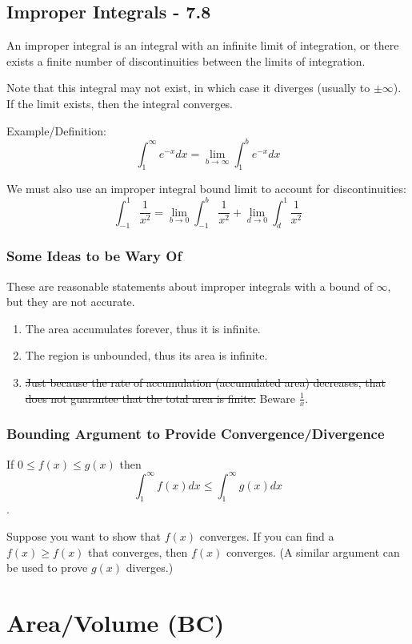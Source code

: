 \documentclass{article}
\begin{document}
\subsection{Improper Integrals - 7.8}
An improper integral is an integral with an infinite limit of integration, or there exists a finite number of discontinuities between the limits of integration.

Note that this integral may not exist, in which case it diverges (usually to $\pm \infty$). If the limit exists, then the integral converges.

Example/Definition:
$$\int_{1}^{\infty} e^{-x} dx = \lim_{b \to \infty} \int_{1}^{b} e^{-x} dx $$

We must also use an improper integral bound limit to account for discontinuities:
$$\int_{-1}^{1} \frac{1}{x^2} = \lim_{b \to 0} \int_{-1}^{b} \frac{1}{x^2} + \lim_{d \to 0} \int_{d}^{1} \frac{1}{x^2} $$

\subsubsection{Some Ideas to be Wary Of}
These are reasonable statements about improper integrals with a bound of $\infty$, but they are not accurate.

\begin{enumerate}
    \item The area accumulates forever, thus it is infinite.
    \item The region is unbounded, thus its area is infinite.
    \item \st{Just because the rate of accumulation (accumulated area) decreases, that does not guarantee that the total area is finite.} Beware $\frac{1}{x}$.
\end{enumerate}

\subsubsection{Bounding Argument to Provide Convergence/Divergence}
If $0 \le f(x) \le g(x)$ then $$\int_{1}^{\infty} f(x) dx \le \int_{1}^{\infty} g(x) dx$$.

Suppose you want to show that $f(x)$ converges. If you can find a $f(x) \ge f(x)$ that converges, then $f(x)$ converges. (A similar argument can be used to prove $g(x)$ diverges.)

\section{Area/Volume (BC)}
\end{document}
